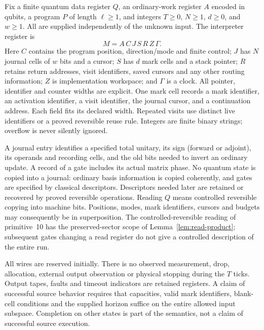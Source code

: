 \begin{definition}\label{def:tB-state}
Fix a finite quantum data register $Q$, an ordinary-work register $A$
encoded in qubits, a program $P$ of length $\ell\geq1$, and integers
$T\geq0$, $N\geq1$, $d\geq0$, and $w\geq1$.
All are supplied independently of the unknown input.
The interpreter register is
\[
 M=A\,C\,J\,S\,R\,Z\,\Gamma.
\]
Here $C$ contains the program position, direction/mode and finite
control; $J$ has $N$ journal cells of $w$ bits and a cursor;
$S$ has $d$ mark cells and a stack pointer; $R$ retains return addresses,
visit identifiers, saved cursors and any other routing information;
$Z$ is implementation workspace; and $\Gamma$ is a clock. All pointer,
identifier and counter widths are explicit. One mark cell records a
mark identifier, an activation identifier, a visit identifier, the
journal cursor, and a continuation address. Each field fits its declared
width. Repeated visits use distinct live identifiers or a proved reversible
reuse rule. Integers are finite binary strings; overflow is never silently
ignored.

A journal entry identifies a specified total unitary, its sign (forward
or adjoint), its operands and recording cells, and the old bits needed
to invert an ordinary update. A record of a gate includes its actual
matrix phase. No quantum state is copied into a journal: ordinary
basis information is copied coherently, and gates are specified by
classical descriptors. Descriptors needed later are retained or recovered
by proved reversible operations. Reading $Q$ means controlled reversible
copying into machine bits. Positions, modes, mark identifiers, cursors and
budgets may consequently be in superposition. The controlled-reversible
reading of primitive~10 has the preserved-sector scope of
Lemma~\ref{lem:read-product}; subsequent gates changing a read register
do not give a controlled description of the entire run.

All wires are reserved initially. There is no observed measurement,
drop, allocation, external output observation or physical stopping during
the $T$ ticks. Output tapes, faults and timeout indicators are retained
registers. A claim of successful source behavior requires that capacities,
valid mark identifiers, blank-cell conditions and the supplied horizon
suffice on the entire allowed input subspace. Completion on other states
is part of the semantics, not a claim of successful source execution.
\end{definition}


